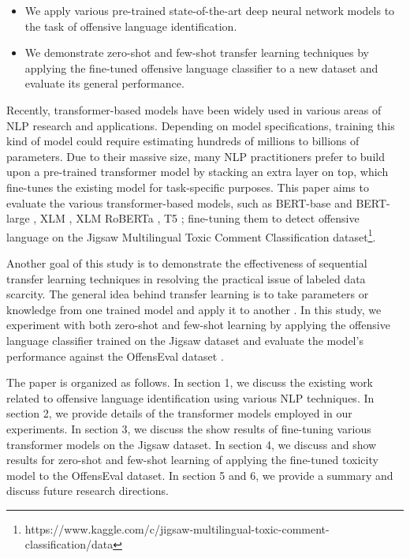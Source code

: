 \documentclass[11pt,a4paper]{article}
\begin{document}
\begin{itemize}
  \item We apply various pre-trained state-of-the-art deep neural network models to the task of offensive language identification.
  \item We demonstrate zero-shot and few-shot transfer learning techniques by applying the fine-tuned offensive language classifier to a new dataset and evaluate its general performance. 
\end{itemize}

Recently, transformer-based models \citep{DBLP:journals/corr/VaswaniSPUJGKP17} have been widely used in various areas of NLP research and applications. Depending on model specifications, training this kind of model could require estimating hundreds of millions to billions of parameters. Due to their massive size, many NLP practitioners prefer to build upon a pre-trained transformer model by stacking an extra layer on top, which fine-tunes the existing model for task-specific purposes. This paper aims to evaluate the various transformer-based models, such as BERT-base and BERT-large \citep{DBLP:journals/corr/abs-1810-04805}, XLM \citep{DBLP:journals/corr/abs-1901-07291}, XLM RoBERTa \citep{conneau2019unsupervised}, T5 \citep{raffel2019exploring}; fine-tuning them to detect offensive language on the Jigsaw Multilingual Toxic Comment Classification dataset\footnote{https://www.kaggle.com/c/jigsaw-multilingual-toxic-comment-classification/data}.

Another goal of this study is to demonstrate the effectiveness of sequential transfer learning techniques in resolving the practical issue of labeled data scarcity. The general idea behind transfer learning is to take parameters or knowledge from one trained model and apply it to another \citep{ruder-etal-2019-transfer}. In this study, we experiment with both zero-shot and few-shot learning by applying the offensive language classifier trained on the Jigsaw dataset and evaluate the model's performance against the OffensEval dataset \citep{zampierietal2019}. 

The paper is organized as follows. In section 1, we discuss the existing work related to offensive language identification using various NLP techniques. In section 2, we provide details of the transformer models employed in our experiments. In section 3, we discuss the show results of fine-tuning various transformer models on the Jigsaw dataset. In section 4, we discuss and show results for zero-shot and few-shot learning of applying the fine-tuned toxicity model to the OffensEval dataset. In section 5 and 6, we provide a summary and discuss future research directions.
\end{document}
